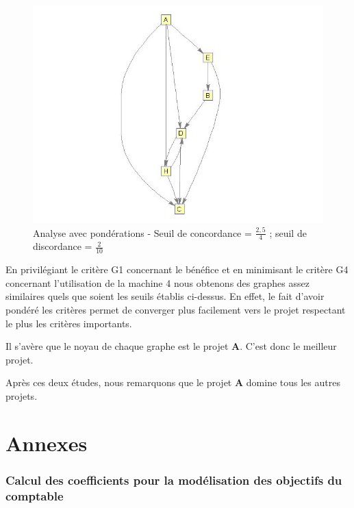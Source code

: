 \documentclass[a4paper,10pt]{article}
\begin{document}
\begin{figure}[H]
\begin{center}
\includegraphics[scale=0.3]{img/G4-pond.jpg}
\caption{Analyse avec pondérations - Seuil de concordance = $\frac{2,5}{4}$ ; seuil de discordance = $\frac{2}{10}$}
\end{center}
\end{figure}

En privilégiant le critère G1 concernant le bénéfice et en minimisant le critère G4 concernant l'utilisation de la machine 4 nous obtenons des graphes assez similaires quels que soient les seuils établis ci-dessus. En effet, le fait d'avoir pondéré les critères permet de converger plus facilement vers le projet respectant le plus les critères importants.

Il s'avère que le noyau de chaque graphe est le projet \textbf{A}. C'est donc le meilleur projet.

Après ces deux études, nous remarquons que le projet \textbf{A} domine tous les autres projets.



\newpage
\part{Annexes}
\appendix

\section{Calcul des coefficients pour la modélisation des objectifs du comptable}
\label{annexe}
\end{document}
